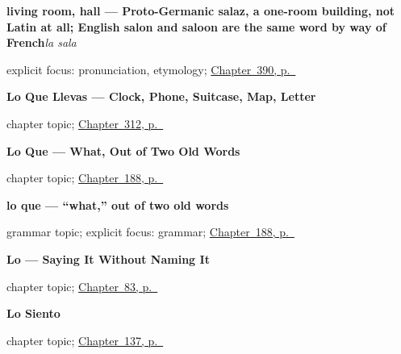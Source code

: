 \noindent\begin{minipage}[t]{\linewidth}
\raggedright
\textbf{living room, hall — Proto-Germanic salaz, a one-room building, not Latin at all; English salon and saloon are the same word by way of French}\enspace\emph{la sala}\par
\footnotesize explicit focus: pronunciation, etymology; \hyperref[ch:la-terraza-y-la-sala]{Chapter~390, p.~\pageref*{ch:la-terraza-y-la-sala}}
\end{minipage}\par\smallskip

\noindent\begin{minipage}[t]{\linewidth}
\raggedright
\textbf{Lo Que Llevas --- Clock, Phone, Suitcase, Map, Letter}\par
\footnotesize chapter topic; \hyperref[ch:lo-que-llevas]{Chapter~312, p.~\pageref*{ch:lo-que-llevas}}
\end{minipage}\par\smallskip

\noindent\begin{minipage}[t]{\linewidth}
\raggedright
\textbf{Lo Que --- What, Out of Two Old Words}\par
\footnotesize chapter topic; \hyperref[ch:lo-que]{Chapter~188, p.~\pageref*{ch:lo-que}}
\end{minipage}\par\smallskip

\noindent\begin{minipage}[t]{\linewidth}
\raggedright
\textbf{lo que — \textquotedblleft{}what,\textquotedblright{} out of two old words}\par
\footnotesize grammar topic; explicit focus: grammar; \hyperref[ch:lo-que]{Chapter~188, p.~\pageref*{ch:lo-que}}
\end{minipage}\par\smallskip

\noindent\begin{minipage}[t]{\linewidth}
\raggedright
\textbf{Lo --- Saying It Without Naming It}\par
\footnotesize chapter topic; \hyperref[ch:pronoun-lo]{Chapter~83, p.~\pageref*{ch:pronoun-lo}}
\end{minipage}\par\smallskip

\noindent\begin{minipage}[t]{\linewidth}
\raggedright
\textbf{Lo Siento}\par
\footnotesize chapter topic; \hyperref[ch:spanish-sorry]{Chapter~137, p.~\pageref*{ch:spanish-sorry}}
\end{minipage}\par\smallskip

